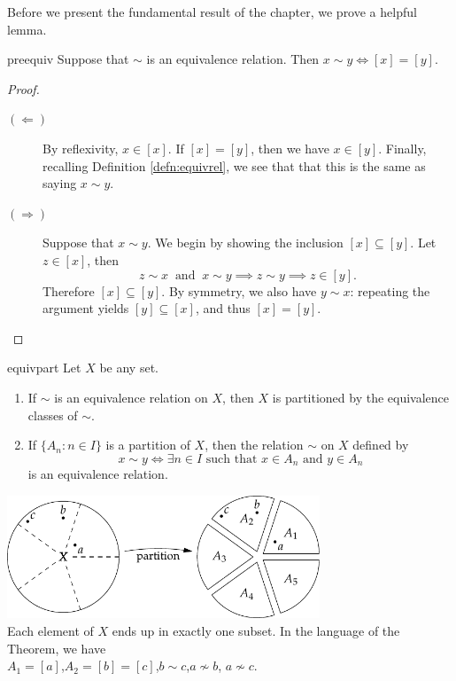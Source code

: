 
Before we present the fundamental result of the chapter, we prove a helpful lemma.

\begin{lemm}{}{preequiv}
	Suppose that $\sim$ is an equivalence relation. Then $x\sim y\iff [x]=[y]$.
\end{lemm}

\begin{proof}
	\begin{description}
		\item[$(\Leftarrow)$]\quad By reflexivity, $x\in[x]$. If $[x]=[y]$, then we have $x\in[y]$. Finally, recalling Definition \ref{defn:equivrel}, we see that that this is the same as saying $x\sim y$.
		\item[$(\Rightarrow)$]\quad Suppose that $x\sim y$. We begin by showing the inclusion $[x]\subseteq [y]$. Let $z\in[x]$, then
		\[z\sim x\ \text{ and }\ x\sim y\implies z\sim y\implies z\in[y].\tag{Transitivity}\]
		Therefore $[x]\subseteq[y]$. By symmetry, we also have $y\sim x$: repeating the argument yields $[y]\subseteq [x]$, and thus $[x]=[y]$.\qedhere
	\end{description}
\end{proof}

\begin{thm}{}{equivpart}
	Let $X$ be any set.
	\begin{enumerate}
		\item If $\sim$ is an equivalence relation on $X$, then $X$ is partitioned by the equivalence classes of $\sim$.
		\item If $\{A_n:n\in I\}$ is a partition of $X$, then the relation $\sim$ on $X$ defined by
		\[
			x\sim y\iff \exists n\in I\text{ such that $x\in A_n$ and }y\in A_n
		\]
		is an equivalence relation.
	\end{enumerate}
\end{thm}

\begin{center}
	\includegraphics[width=0.7\textwidth]{relations-08-part}\\
	Each element of $X$ ends up in exactly one subset. In the language of the Theorem, we have\\[5pt]
	$A_1=[a]$,\quad $A_2=[b]=[c]$,\quad $b\sim c$,\quad $a\nsim b$, \quad $a\nsim c$.
\end{center}

